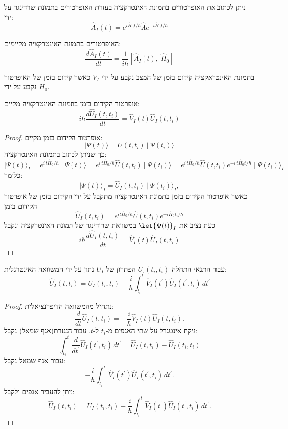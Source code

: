 \documentclass{tstextbook}
\begin{document}
\begin{proposition}
ניתן לכתוב את האופרטורים בתמונת האינטרקציה בעזרת האופרטורים בתמונת שרדינגר על ידי:
$$\hat{A}_{I}(t)=e^{i\hat{H}_{0}t/\hbar}\hat{A}e^{-i\hat{H}_{0}t/\hbar}$$

\end{proposition}
\begin{proposition}
האופרטורים בתמונת האינטרקציה מקיימים:
$$\frac{d\hat{A}_{I}(t)}{d t}=\frac{1}{i\hbar}\left[\hat{A}_{I}(t),\;\hat{H}_{0}\right]$$

\end{proposition}
\begin{corollary}
בתמונת האינטראקציה קידום בזמן של המצב נקבע על ידי \(V_{I}\) כאשר קידום בזמן של האופרטור נקבע על ידי \(H_{0}\).

\end{corollary}
\begin{proposition}
אופרטור הקידום בזמן בתמונת האינטרקציה מקיים:
$$i\hbar\frac{d\hat{U}_{I}(t,t_{i})}{d t}=\hat{V}_{I}(t)\hat{U}_{I}(t,t_{i})$$

\end{proposition}
\begin{proof}
אופרטור הקידום בזמן מקיים:
$$\mid\Psi(t)\rangle={U}(t,t_{i})\mid\Psi(t_{i})\rangle$$
כך שניתן לכתוב בתמונת האינטרקציה:
$$\mid\Psi(t)\rangle_{I}=e^{i\,t\hat{H}_{0}/\hbar}\mid\Psi(t)\rangle=e^{i\,t\hat{H}_{0}/\hbar}\hat{U}(t,t_{i})\mid\Psi(t_{i})\rangle=e^{i\,t\hat{H}_{0}/\hbar}\hat{U}(t,t_{i})e^{-i\,t\hat{H}_{0}t/\hbar}\mid\Psi(t_{i})\rangle_{I}$$
כלומר:
$$\mid\Psi(t)\rangle_{I}=\hat{U}_{I}(t,t_{i})\mid\Psi(t_{i})\rangle_{I},$$
כאשר אופרטור הקידום בזמן בתמונת האינטרקציה מתקבל על ידי הקידום בזמן של אופרטור הקידום בזמן 
$$\hat{U}_{I}(t,t_{i})=e^{i t\hat{H}_{0}/\hbar}\hat{U}(t,t_{i})e^{-i\hat{H}_{0}t_{i}/\hbar}$$
כעת נציב את \(\ket{\Psi(t)}_{I}\) במשוואת שרודינגר של תמונת האינטרקציה ונקבל:
$$i\hbar\frac{d\hat{U}_{I}(t,t_{i})}{d t}=\hat{V}_{I}(t)\hat{U}_{I}(t,t_{i})$$

\end{proof}
\begin{corollary}
עבור התנאי התחלה \(U_{I}(t_{i},t_{i})\) הפתרון של \(U_{I}\) נתון על ידי המשוואה האינטרגלית:
$$\hat{U}_{I}(t,t_{i})=U_{I}(t_{i},t_{i}) -\frac{i}{\hbar}\int_{t_{i}}^{t}\hat{V}_{I}\left( t^{\prime} \right)\hat{U}_{I}\left( t^{\prime},t_{i} \right)\,d t^{\prime}$$

\end{corollary}
\begin{proof}
נתחיל מהמשוואה הדיפרנציאלית:
$$\frac{d}{d t}\hat{U}_{I}(t,t_{i})=-\frac{i}{\hbar}\hat{V}_{I}(t)\hat{U}_{I}(t,t_{i}).$$
ניקח אינטגרל על שתי האגפים מ-\(t_{i}\) ל-\(t\). עבור הנגזרת(אגף שמאל) נקבל:
$$\int_{t_{i}}^{t}{\frac{d}{d t^{\prime}}}{\hat{U}}_{I}\left( t^{\prime},t_{i} \right)\,d t^{\prime}={\hat{U}}_{I}(t,t_{i})-{\hat{U}}_{I}(t_{i},t_{i}) $$
עבור אגף שמאל נקבל:
$$-\frac{i}{\hbar}\int_{t_{i}}^{t}\hat{V}_{I}(t^{\prime})\hat{U}_{I}(t^{\prime},t_{i})\,d t^{\prime}.$$
ניתן להעביר אגפים ולקבל:
$$\hat{U}_{I}(t,t_{i})=U_{I}(t_{i},t_{i}) -\frac{i}{\hbar}\int_{t_{i}}^{t}\hat{V}_{I}\left( t^{\prime} \right)\hat{U}_{I}\left( t^{\prime},t_{i} \right)\,d t^{\prime}.$$

\end{proof}
\end{document}
